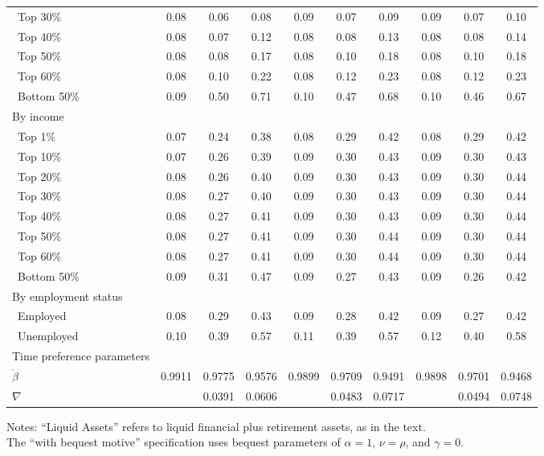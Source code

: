 \documentclass{econtex}\usepackage[pdftex]{graphicx}\usepackage{epstopdf} \usepackage[pdftex]{hyperref}
\newcommand{\CRRA}{\ensuremath{\rho}}
\newcommand{\Discount}{\ensuremath{\beta}}
\begin{document}
\begin{table}
\begin{minipage}{\textwidth}
\begin{center}
\begin{tabular}{l c c c c c c c c c}
\ Top 30\% & 0.08  & 0.06 & 0.08 & 0.09 & 0.07 & 0.09 & 0.09 & 0.07 & 0.10 \\
\ Top 40\% & 0.08  & 0.07 & 0.12 & 0.08 & 0.08 & 0.13 & 0.08 & 0.08 & 0.14 \\
\ Top 50\% & 0.08  & 0.08 & 0.17 & 0.08 & 0.10 & 0.18 & 0.08 & 0.10 & 0.18 \\
\ Top 60\% & 0.08  & 0.10 & 0.22 & 0.08 & 0.12 & 0.23 & 0.08 & 0.12 & 0.23 \\
\ Bottom 50\% & 0.09  & 0.50 & 0.71 & 0.10 & 0.47 & 0.68 & 0.10 & 0.46 & 0.67 \\
By income  &  & & & & & & & &  \\
\ Top 1\% & 0.07  & 0.24 & 0.38 & 0.08 & 0.29 & 0.42 & 0.08 & 0.29 & 0.42 \\
\ Top 10\% & 0.07  & 0.26 & 0.39 & 0.09 & 0.30 & 0.43 & 0.09 & 0.30 & 0.43 \\
\ Top 20\% & 0.08  & 0.26 & 0.40 & 0.09 & 0.30 & 0.43 & 0.09 & 0.30 & 0.44 \\
\ Top 30\% & 0.08  & 0.27 & 0.40 & 0.09 & 0.30 & 0.43 & 0.09 & 0.30 & 0.44 \\
\ Top 40\% & 0.08  & 0.27 & 0.41 & 0.09 & 0.30 & 0.43 & 0.09 & 0.30 & 0.44 \\
\ Top 50\% & 0.08  & 0.27 & 0.41 & 0.09 & 0.30 & 0.44 & 0.09 & 0.30 & 0.44 \\
\ Top 60\% & 0.08  & 0.27 & 0.41 & 0.09 & 0.30 & 0.44 & 0.09 & 0.30 & 0.44 \\
\ Bottom 50\% & 0.09 & 0.31 & 0.47 & 0.09 & 0.27 & 0.43 & 0.09 & 0.26 & 0.42 \\
By employment status   &  & & & & &  & &  &  \\
\ Employed & 0.08  & 0.29 & 0.43 & 0.09 & 0.28 & 0.42 & 0.09 & 0.27 & 0.42 \\
\ Unemployed & 0.10  & 0.39 & 0.57 & 0.11 & 0.39 & 0.57 & 0.12 & 0.40 & 0.58 \\
\midrule
Time preference parameters   &  & & & & &  & & &  \\
$\grave{\Discount}$   & 0.9911 & 0.9775 & 0.9576 & 0.9899 & 0.9709 & 0.9491 & 0.9898 & 0.9701 & 0.9468 \\
$\nabla$   &  & 0.0391 & 0.0606 &  & 0.0483 & 0.0717 &  & 0.0494 & 0.0748 \\
\bottomrule

\end{tabular}
\end{center}
\footnotesize{Notes: ``Liquid Assets'' refers to liquid financial plus retirement assets, as in the text.
\\The ``with bequest motive'' specification uses bequest parameters of $\alpha = 1$, $\nu = \CRRA$, and $\gamma = 0$.}
\end{minipage}
\end{table}
\end{document}
